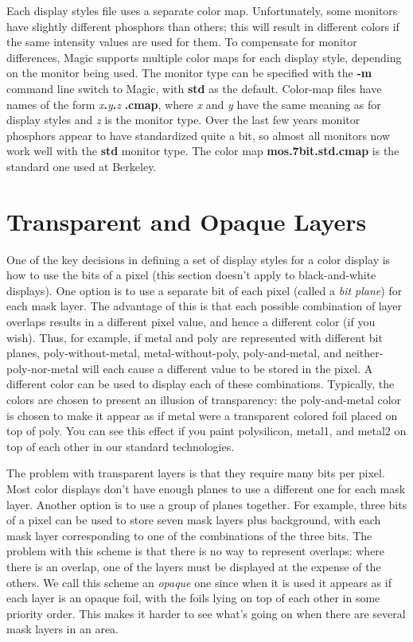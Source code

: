 \documentclass[letterpaper,twoside,12pt]{article}
\begin{document}
Each display styles file uses a separate color map.  Unfortunately,
some monitors have slightly different phosphors than others;  this
will result in different colors if the same intensity values are used
for them.  To compensate for monitor differences, Magic
supports multiple color maps for each display style, depending on
the monitor being used.  The monitor type can be specified with
the {\bfseries -m} command line switch to Magic, with {\bfseries std}
as the default.  Color-map files have names
of the form {\itshape x}{\bfseries .}{\itshape y}{\bfseries .}{\itshape z}
{\bfseries .cmap}, where {\itshape x} and
{\itshape y} have the same meaning as for display styles and {\itshape z} is
the monitor type.  Over the last few years monitor phosphors appear
to have standardized quite a bit, so almost all monitors now work
well with the {\bfseries std} monitor type.  The color map {\bfseries mos.7bit.std.cmap}
is the standard one used at Berkeley.

\section{Transparent and Opaque Layers}

One of the key decisions in defining a set of display styles
for a color display is how to use the bits of a pixel (this section
doesn't apply to black-and-white displays).  One option is to use
a separate bit of each pixel (called a {\itshape bit plane}) for each mask
layer.  The advantage of this is that each possible combination of
layer overlaps results in a different pixel value, and hence
a different color (if you wish).  Thus, for example, if metal
and poly are represented with different bit planes, poly-without-metal,
metal-without-poly, poly-and-metal, and neither-poly-nor-metal will
each cause a different value to be stored in the pixel.  A different
color can be used to display each of these combinations.  Typically,
the colors are chosen to present an illusion of transparency:  the
poly-and-metal color is chosen to make it appear as if metal were
a transparent colored foil placed on top of poly.  You can see this
effect if you paint polysilicon, metal1, and metal2 on top of each
other in our standard technologies.

The problem with transparent layers is that they require many bits
per pixel.  Most color displays don't have enough planes to use
a different one for each mask layer.  Another option is to use
a group of planes together.  For example, three bits of a pixel
can be used to store seven mask layers plus background, with
each mask layer corresponding to one of the combinations of
the three bits.  The problem with this scheme is that there
is no way to represent overlaps:  where there is an overlap,
one of the layers must be displayed at the expense of the
others.  We call this scheme an {\itshape opaque} one since when it
is used it appears as if each layer is an opaque foil, with
the foils lying on top of each other in some priority order.
This makes it harder to see what's going on when there are
several mask layers in an area.
\end{document}
